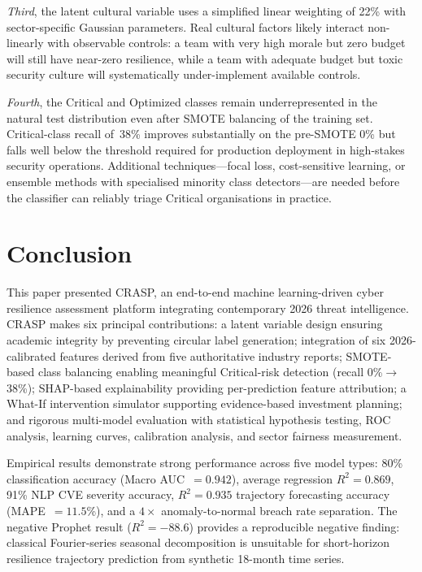 \documentclass[journal]{IEEEtran}
\begin{document}
\emph{Third}, the latent cultural variable uses a simplified linear weighting
of 22\% with sector-specific Gaussian parameters. Real cultural factors
likely interact non-linearly with observable controls: a team with very
high morale but zero budget will still have near-zero resilience, while a
team with adequate budget but toxic security culture will systematically
under-implement available controls.

\emph{Fourth}, the Critical and Optimized classes remain underrepresented
in the natural test distribution even after SMOTE balancing of the training
set. Critical-class recall of~38\% improves substantially on the pre-SMOTE
0\% but falls well below the threshold required for production deployment
in high-stakes security operations. Additional techniques---focal loss,
cost-sensitive learning, or ensemble methods with specialised minority
class detectors---are needed before the classifier can reliably triage
Critical organisations in practice.


\section{Conclusion}
\label{sec:conc}

This paper presented CRASP, an end-to-end machine learning-driven cyber
resilience assessment platform integrating contemporary 2026 threat
intelligence. CRASP makes six principal contributions: a latent variable
design ensuring academic integrity by preventing circular label generation;
integration of six 2026-calibrated features derived from five authoritative
industry reports; SMOTE-based class balancing enabling meaningful
Critical-risk detection (recall 0\%$\rightarrow$38\%); SHAP-based
explainability providing per-prediction feature attribution; a What-If
intervention simulator supporting evidence-based investment planning; and
rigorous multi-model evaluation with statistical hypothesis testing, ROC
analysis, learning curves, calibration analysis, and sector fairness
measurement.

Empirical results demonstrate strong performance across five model types:
80\% classification accuracy (Macro AUC~$= 0.942$), average regression
$R^2 = 0.869$, 91\% NLP CVE severity accuracy, $R^2 = 0.935$ trajectory
forecasting accuracy (MAPE~$= 11.5$\%), and a $4\times$ anomaly-to-normal
breach rate separation. The negative Prophet result ($R^2 = -88.6$) provides
a reproducible negative finding: classical Fourier-series seasonal
decomposition is unsuitable for short-horizon resilience trajectory
prediction from synthetic 18-month time series.
\end{document}
